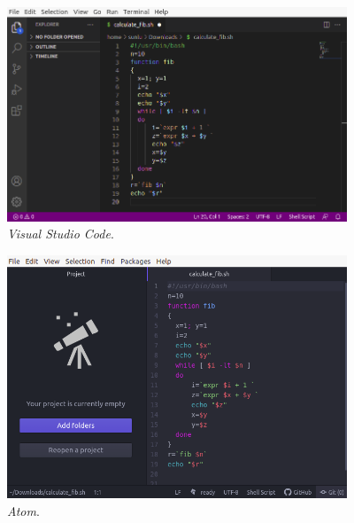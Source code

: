 \begin{figure}
	\centering
	\includegraphics[width=4in]{chapters/ch_text_file_editing/figures/vscode_fib.png}
	\caption{\textit{Visual Studio Code}.}
\end{figure}

\begin{figure}
	\centering
	\includegraphics[width=4in]{chapters/ch_text_file_editing/figures/atom_fib.png}
	\caption{\textit{Atom}.}
\end{figure}

















